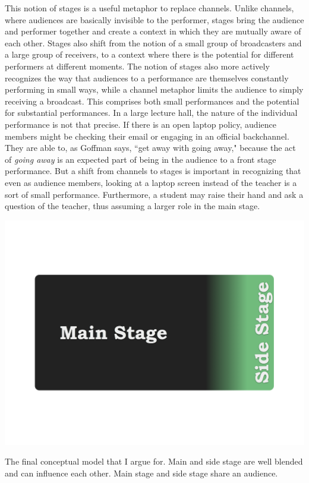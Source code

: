 This notion of stages is a useful metaphor to replace channels. Unlike channels, where audiences are basically invisible to the performer, stages bring the audience and performer together and create a context in which they are mutually aware of each other. Stages also shift from the notion of a small group of broadcasters and a large group of receivers, to a context where there is the potential for different performers at different moments. The notion of stages also more actively recognizes the way that audiences to a performance are themselves constantly performing in small ways, while a channel metaphor limits the audience to simply receiving a broadcast. This comprises both small performances and the potential for substantial performances. In a large lecture hall, the nature of the individual performance is not that precise. If there is an open laptop policy, audience members might be checking their email or engaging in an official backchannel.  They are able to, as Goffman says, ``get away with going away," because the act of \emph{going away} is an expected part of being in the audience to a front stage performance. But a shift from channels to stages is important in recognizing that even as audience members, looking at a laptop screen instead of the teacher is a sort of small performance. Furthermore, a student may raise their hand and ask a question of the teacher, thus assuming a larger role in the main stage.

\begin{marginfigure}
	\includegraphics{figures/main-side-final.png}
	\caption{The final conceptual model that I argue for. Main and side stage are well blended and can influence each other. Main stage and side stage share an audience.}
	\label{fig:main-side-stage}
\end{marginfigure}


